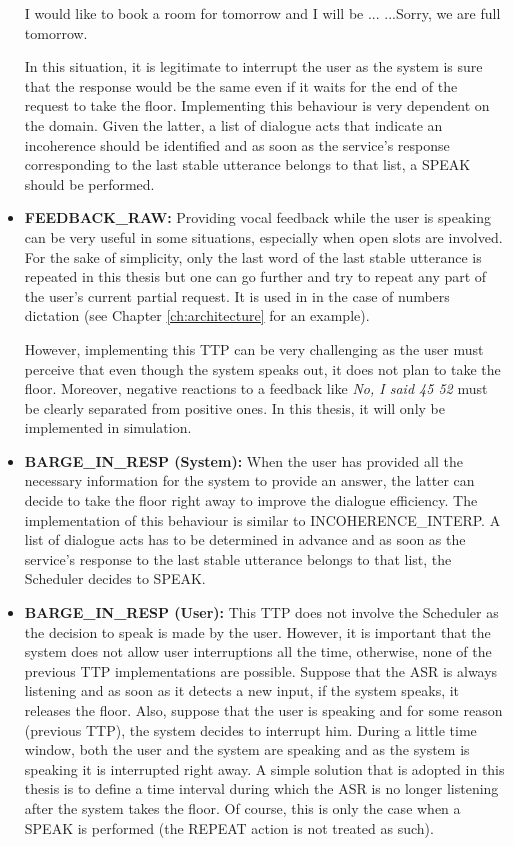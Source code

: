 \begin{itemize}
					\begin{dialogue}
						 I would like to book a room for tomorrow and I will be ...
						 ...Sorry, we are full tomorrow.
					\end{dialogue}
					
					In this situation, it is legitimate to interrupt the user as the system is sure that the response would be the same even if it waits for the end of the request to take the floor. Implementing this behaviour is very dependent on the domain. Given the latter, a list of dialogue acts that indicate an incoherence should be identified and as soon as the service's response corresponding to the last stable utterance belongs to that list, a SPEAK should be performed.
					
     \item \textbf{FEEDBACK\_RAW:} Providing vocal feedback while the user is speaking can be very useful in some situations, especially when open slots are involved. For the sake of simplicity, only the last word of the last stable utterance is repeated in this thesis but one can go further and try to repeat any part of the user's current partial request. It is used in \cite{Skantze2009,Khouzaimi2014a} in the case of numbers dictation (see Chapter \ref{ch:architecture} for an example).
			
				However, implementing this TTP can be very challenging as the user must perceive that even though the system speaks out, it does not plan to take the floor. Moreover, negative reactions to a feedback like \textit{No, I said 45 52} must be clearly separated from positive ones. In this thesis, it will only be implemented in simulation.
				
     \item \textbf{BARGE\_IN\_RESP (System):} When the user has provided all the necessary information for the system to provide an answer, the latter can decide to take the floor right away to improve the dialogue efficiency. The implementation of this behaviour is similar to INCOHERENCE\_INTERP. A list of dialogue acts has to be determined in advance and as soon as the service's response to the last stable utterance belongs to that list, the Scheduler decides to SPEAK.
			
     \item \textbf{BARGE\_IN\_RESP (User):} This TTP does not involve the Scheduler as the decision to speak is made by the user. However, it is important that the system does not allow user interruptions all the time, otherwise, none of the previous TTP implementations are possible. Suppose that the ASR is always listening and as soon as it detects a new input, if the system speaks, it releases the floor. Also, suppose that the user is speaking and for some reason (previous TTP), the system decides to interrupt him. During a little time window, both the user and the system are speaking and as the system is speaking it is interrupted right away. A simple solution that is adopted in this thesis is to define a time interval during which the ASR is no longer listening after the system takes the floor. Of course, this is only the case when a SPEAK is performed (the REPEAT action is not treated as such).
     \end{itemize}
